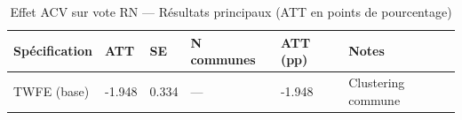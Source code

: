\begin{table}
\caption{Effet ACV sur vote RN — Résultats principaux (ATT en points de pourcentage)}
\label{tab:main}
\begin{tabular}{llllll}
\toprule
Spécification & ATT & SE & N communes & ATT (pp) & Notes \\
\midrule
TWFE (base) & -1.948 & 0.334 & — & -1.948 & Clustering commune \\
\bottomrule
\end{tabular}
\end{table}
